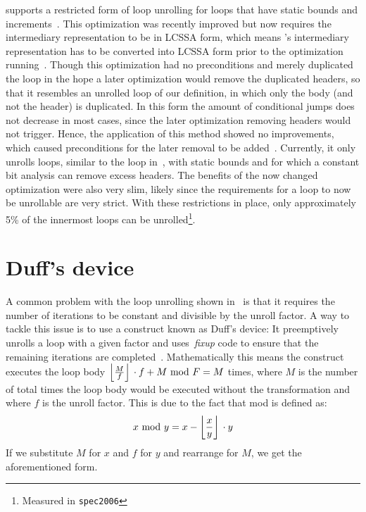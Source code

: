 \libFIRM{} supports a restricted form of loop unrolling for loops that have static bounds and increments~\cite{helmer10studienarbeit}.
This optimization was recently improved but now requires the intermediary representation to be in LCSSA form, which means \libFIRM{}'s intermediary representation has to be converted into LCSSA form prior to the optimization running~\cite{aebi18bachelorarbeit}.
Though this optimization had no preconditions and merely duplicated the loop in the hope a later optimization would remove the duplicated headers, so that it resembles an unrolled loop of our definition, in which only the body (and not the header) is duplicated.
In this form the amount of conditional jumps does not decrease in most cases, since the later optimization removing headers would not trigger.
Hence, the application of this method showed no improvements, which caused preconditions for the later removal to be added~\cite{libfirm-unroll-static}.
Currently, it only unrolls loops, similar to the loop in~, with static bounds and for which a constant bit analysis can remove excess headers.
The benefits of the now changed optimization were also very slim, likely since the requirements for a loop to now be unrollable are very strict.
With these restrictions in place, only approximately 5\% of the innermost loops can be unrolled\footnote{Measured in \texttt{spec2006}}.




\section{Duff's device}\label{sec:basics:duffs}

A common problem with the loop unrolling shown in~ is that it requires the number of iterations to be constant and divisible by the unroll factor.
A way to tackle this issue is to use a construct known as Duff's device: It preemptively unrolls a loop with a given factor and uses~\textit{fixup} code to ensure that the remaining iterations are completed~\cite{duff_1983}.
Mathematically this means the construct executes the loop body $\left\lfloor{}\frac{M}{f}\right\rfloor{} \cdot f + M \text{ mod } F = M$ times, where $M$ is the number of total times the loop body would be executed without the transformation and where $f$ is the unroll factor.
This is due to the fact that mod is defined as:
$$x \text{ mod }{} y = x - \left\lfloor{}\frac{x}{y}\right\rfloor{} \cdot y$$
If we substitute $M$ for $x$ and $f$ for $y$ and rearrange for $M$, we get the aforementioned form.

